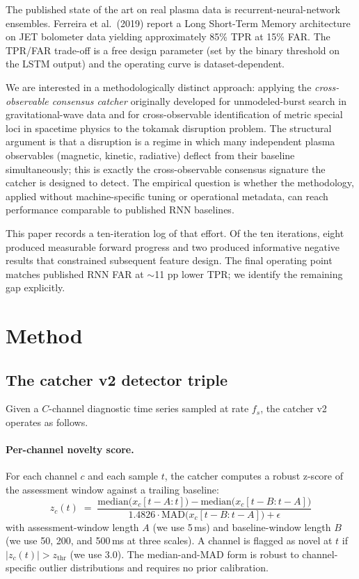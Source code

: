\documentclass[11pt,letterpaper]{article}
\begin{document}
The published state of the art on real plasma data is
recurrent-neural-network ensembles. Ferreira et al.\ (2019)
\cite{ferreira2019} report a Long Short-Term Memory architecture on JET
bolometer data yielding approximately 85\% TPR at 15\% FAR. The TPR/FAR
trade-off is a free design parameter (set by the binary threshold on
the LSTM output) and the operating curve is dataset-dependent.

We are interested in a methodologically distinct approach: applying the
\emph{cross-observable consensus catcher} originally developed for
unmodeled-burst search in gravitational-wave data
\cite{systrophe_gw} and for cross-observable identification of metric
special loci in spacetime physics \cite{systrophe_lp_ridge} to the
tokamak disruption problem. The structural argument is that a
disruption is a regime in which many independent plasma observables
(magnetic, kinetic, radiative) deflect from their baseline
simultaneously; this is exactly the cross-observable consensus
signature the catcher is designed to detect. The empirical question is
whether the methodology, applied without machine-specific tuning or
operational metadata, can reach performance comparable to published RNN
baselines.

This paper records a ten-iteration log of that effort. Of the ten
iterations, eight produced measurable forward progress and two produced
informative negative results that constrained subsequent feature design.
The final operating point matches published RNN FAR at $\sim$11 pp
lower TPR; we identify the remaining gap explicitly.

\section{Method}\label{sec:method}

\subsection{The catcher v2 detector triple}\label{ssec:catcher}

Given a $C$-channel diagnostic time series sampled at rate $f_s$, the
catcher v2 operates as follows.

\paragraph{Per-channel novelty score.} For each channel $c$ and each
sample $t$, the catcher computes a robust z-score of the assessment
window against a trailing baseline:
\[
z_c(t) \;=\; \frac{\mathrm{median}\bigl(x_c[t-A : t]\bigr) - \mathrm{median}\bigl(x_c[t-B : t-A]\bigr)}
                  {1.4826 \cdot \mathrm{MAD}\bigl(x_c[t-B : t-A]\bigr) + \epsilon}
\]
with assessment-window length $A$ (we use 5\,ms) and baseline-window
length $B$ (we use 50, 200, and 500\,ms at three scales). A channel is
flagged as novel at $t$ if $|z_c(t)| > z_{\mathrm{thr}}$ (we use 3.0).
The median-and-MAD form is robust to channel-specific outlier
distributions and requires no prior calibration.
\end{document}
